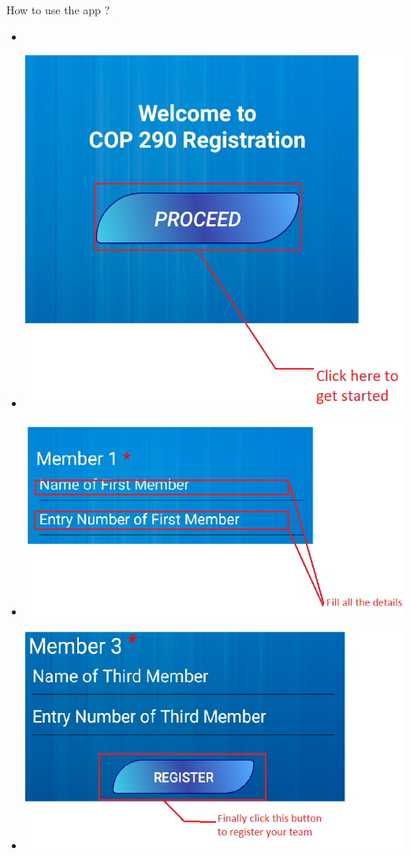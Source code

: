 \documentclass{beamer}
\begin{document}
\begin{frame}{How to use the app ? }
    \begin{itemize}
        \item  
        \item \includegraphics[scale = 0.15]{img1.png}        
        \item \includegraphics[scale = 0.25]{img2.png}
        \item \includegraphics[scale = 0.225]{img3.png}
    \end{itemize}
    
    
    
    
\end{frame}
\end{document}
